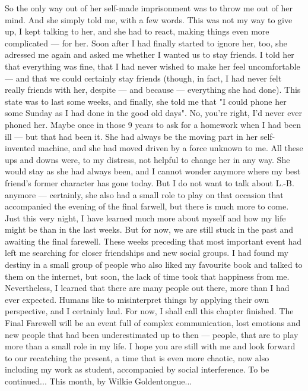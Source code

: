 So the only way out of her self-made imprisonment was to throw me out of her mind. And she simply told me, with a few words. This was not my way to give up, I kept talking to her, and she had to react, making things even more complicated --- for her. Soon after I had finally started to ignore her, too, she adressed me again and asked me whether I wanted us to stay friends. I told her that everything was fine, that I had never wished to make her feel uncomfortable --- and that we could certainly stay friends (though, in fact, I had never felt really friends with her, despite --- and because --- everything she had done). 
This state was to last some weeks, and finally, she told me that "I could phone her some Sunday as I had done in the good old days". 
No, you're right, I'd never ever phoned her. Maybe once in those 9 years to ask for a homework when I had been ill --- but that had been it. She had always be the moving part in her self-invented machine, and she had moved driven by a force unknown to me. 
All these ups and downs were, to my distress, not helpful to change her in any way. She would stay as she had always been, and I cannot wonder anymore where my best friend's former character has gone today. 
But I do not want to talk about L.-B. anymore --- certainly, she also had a small role to play on that occasion that accompanied the evening of the final farwell, but there is much more to come. Just this very night, I have learned much more about myself and how my life might be than in the last weeks. 
But for now, we are still stuck in the past and awaiting the final farewell. These weeks preceding that most important event had left me searching for closer friendships and new social groups. I had found my destiny in a small group of people who also liked my favourite book and talked to them on the internet, but soon, the lack of time took that happiness from me. Nevertheless, I learned that there are many people out there, more than I had ever expected. 
Humans like to misinterpret things by applying their own perspective, and I certainly had. 
For now, I shall call this chapter finished. The Final Farewell will be an event full of complex communication, lost emotions and new people that had been underestimated up to then --- people, that are to play more than a small role in my life. 
I hope you are still with me and look forward to our recatching the present, a time that is even more chaotic, now also including my work as student, accompanied by social interference. 
To be continued...
This month, by Wilkie Goldentongue...

